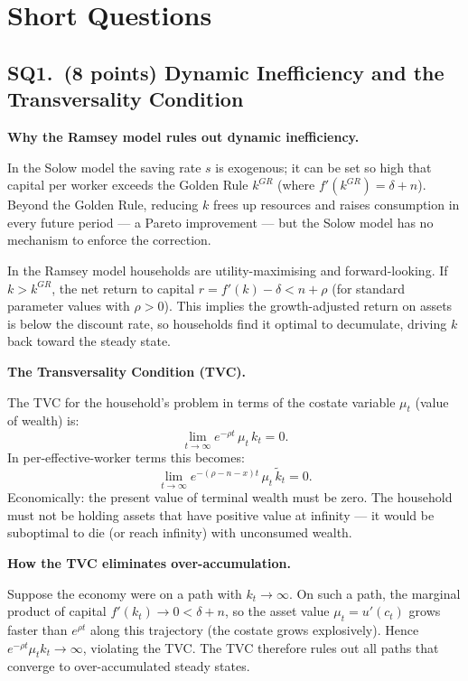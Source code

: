 \documentclass[a4paper,11pt]{article}
\newcommand{\ktilde}{\tilde{k}}
\begin{document}
\clearpage

\section{Short Questions}

\subsection*{SQ1.\ (8 points) Dynamic Inefficiency and the Transversality Condition}

\begin{answerbox}
\textbf{Why the Ramsey model rules out dynamic inefficiency.}

In the Solow model the saving rate $s$ is exogenous; it can be set so high that capital per worker exceeds the Golden Rule $k^{GR}$ (where $f'(k^{GR}) = \delta + n$).  Beyond the Golden Rule, reducing $k$ frees up resources and raises consumption in every future period --- a Pareto improvement --- but the Solow model has no mechanism to enforce the correction.

In the Ramsey model households are utility-maximising and forward-looking.  If $k > k^{GR}$, the net return to capital $r = f'(k) - \delta < n + \rho$ (for standard parameter values with $\rho > 0$).  This implies the growth-adjusted return on assets is below the discount rate, so households find it optimal to decumulate, driving $k$ back toward the steady state.

\textbf{The Transversality Condition (TVC).}

The TVC for the household's problem in terms of the costate variable $\mu_t$ (value of wealth) is:
\[
    \lim_{t\to\infty} e^{-\rho t}\,\mu_t\,k_t = 0.
\]
In per-effective-worker terms this becomes:
\[
    \lim_{t\to\infty} e^{-(\rho - n - x)t}\,\mu_t\,\ktilde_t = 0.
\]
Economically: the present value of terminal wealth must be zero.  The household must not be holding assets that have positive value at infinity --- it would be suboptimal to die (or reach infinity) with unconsumed wealth.

\textbf{How the TVC eliminates over-accumulation.}

Suppose the economy were on a path with $k_t \to \infty$.  On such a path, the marginal product of capital $f'(k_t) \to 0 < \delta + n$, so the asset value $\mu_t = u'(c_t)$ grows faster than $e^{\rho t}$ along this trajectory (the costate grows explosively).  Hence $e^{-\rho t}\mu_t k_t \to \infty$, violating the TVC.  The TVC therefore rules out all paths that converge to over-accumulated steady states.


\end{answerbox}
\end{document}
